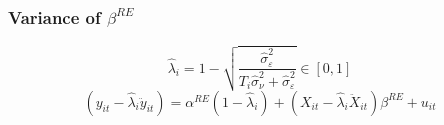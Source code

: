 \documentclass[aspectratio=169,handout]{beamer}
\begin{document}



\begin{frame}
	\frametitle{Variance of $\beta^{RE}$}\label{fr:varRE}

\begin{equation*}
				\hat{\lambda}_i = 1-\sqrt{\frac{
					\hat{\sigma}_{{\varepsilon}}^2
				}{
					T_i\hat{\sigma}_{{\nu}}^2+\hat{\sigma}_{{\varepsilon}}^2
				} }\in [0,1]
			\end{equation*}
			\begin{equation*}
				\left(y_{it} - \hat{\lambda}_i \ddot{y}_{it}\right)
					= \alpha^{RE}(1-\hat{\lambda}_i)
					+ \left(X_{it}-\hat{\lambda}_i\ddot{X}_{it}\right)\beta^{RE}
					+u_{it}
			\end{equation*}
	
	
	\hyperlink{fr:RE_discussion}{}
    	
\end{frame}
\end{document}

